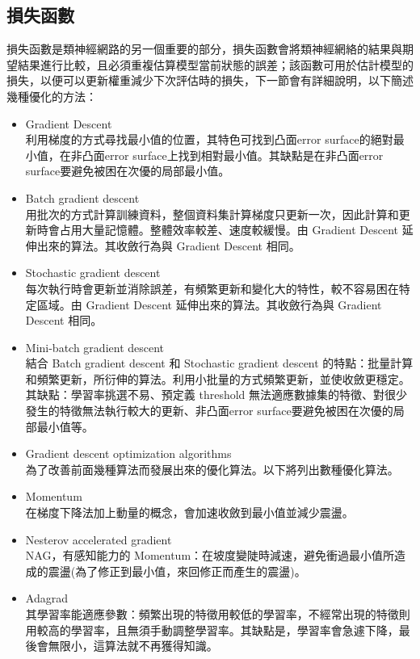 \subsection{損失函數}
損失函數是類神經網路的另一個重要的部分，損失函數會將類神經網絡的結果與期望結果進行比較，且必須重複估算模型當前狀態的誤差；該函數可用於估計模型的損失，以便可以更新權重減少下次評估時的損失，下一節會有詳細說明，以下簡述幾種優化的方法：\\
\begin{itemize}
\item Gradient Descent\\
利用梯度的方式尋找最小值的位置，其特色可找到凸面error surface的絕對最小值，在非凸面error surface上找到相對最小值。其缺點是在非凸面error surface要避免被困在次優的局部最小值。
\item Batch gradient descent\\
用批次的方式計算訓練資料，整個資料集計算梯度只更新一次，因此計算和更新時會占用大量記憶體。整體效率較差、速度較緩慢。由 Gradient Descent 延伸出來的算法。其收斂行為與 Gradient Descent 相同。
\item Stochastic gradient descent\\
每次執行時會更新並消除誤差，有頻繁更新和變化大的特性，較不容易困在特定區域。由 Gradient Descent 延伸出來的算法。其收斂行為與 Gradient Descent 相同。
\item Mini-batch gradient descent\\
結合 Batch gradient descent 和 Stochastic gradient descent 的特點：批量計算和頻繁更新，所衍伸的算法。利用小批量的方式頻繁更新，並使收斂更穩定。其缺點：學習率挑選不易、預定義 threshold 無法適應數據集的特徵、對很少發生的特徵無法執行較大的更新、非凸面error surface要避免被困在次優的局部最小值等。
\item Gradient descent optimization algorithms\\
為了改善前面幾種算法而發展出來的優化算法。以下將列出數種優化算法。
\item Momentum\\
在梯度下降法加上動量的概念，會加速收斂到最小值並減少震盪。
\item Nesterov accelerated gradient\\
NAG，有感知能力的 Momentum：在坡度變陡時減速，避免衝過最小值所造成的震盪(為了修正到最小值，來回修正而產生的震盪)。
\item Adagrad\\
其學習率能適應參數：頻繁出現的特徵用較低的學習率，不經常出現的特徵則用較高的學習率，且無須手動調整學習率。其缺點是，學習率會急遽下降，最後會無限小，這算法就不再獲得知識。

\end{itemize}
